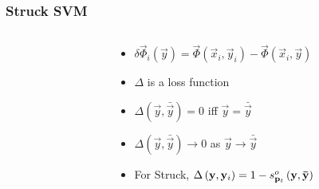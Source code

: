 \begin{frame}
    \frametitle{Struck SVM}
    \begin{columns}[T]
        \begin{column}{0.5\textwidth}
            \struckEquation
        \end{column}
        \begin{column}{0.5\textwidth}
            \begin{itemize}
                \item \(\delta \vec{\Phi}_i \left( \vec{y} \right) = \vec{\Phi} \left( \vec{x}_i, \vec{y}_i \right) - \vec{\Phi} \left( \vec{x}_i, \vec{y} \right)\)
                \item \(\Delta\) is a loss function
                \item \(\Delta \left(\vec{y}, \bar{\vec{y}} \right) = 0\) iff \(\vec{y} =
                    \bar{\vec{y}}\)
                \item \(\Delta \left(\vec{y}, \bar{\vec{y}} \right) \to 0\) as \(\vec{y} \to
                    \bar{\vec{y}}\)
                \item For Struck, \(\Delta\left(\mathbf{y}, \mathbf{y}_i\right) = 1 - s_{\mathbf{p}_t}^o \left( \mathbf{y}, \mathbf{\bar{y}}
                    \right) \)
            \end{itemize}
        \end{column}
    \end{columns}
\end{frame}
